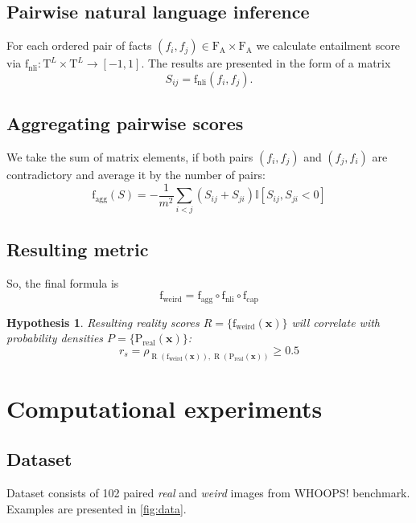 \documentclass[11pt]{article}
\newtheorem{hyp}{Hypothesis}
\begin{document}
\subsection{Pairwise natural language inference}

For each ordered pair of facts $(f_i, f_j) \in \mathrm{F}_\text{A} \times \mathrm{F}_\text{A}$ we calculate entailment score via $\text{f}_\text{nli}: \mathrm{T}^{L}\times \mathrm{T}^{L} \to [-1, 1]$.
The results are presented in the form of a matrix
\[S_{ij} = \text{f}_\text{nli}(f_i, f_j). \]

\subsection{Aggregating pairwise scores}

We take the sum of matrix elements, if both pairs $(f_i, f_j)$ and $(f_j, f_i)$ are contradictory and average it by the number of pairs:
\[\text{f}_\text{agg} (S) = - \dfrac{1}{m^2} \sum\limits_{i < j} (S_{ij} + S_{ji}) \mathbb{I} [S_{ij}, S_{ji} < 0] \]

\subsection{Resulting metric}

So, the final formula is \[\text{f}_\text{weird} = \text{f}_\text{agg} \circ \text{f}_\text{nli} \circ \text{f}_\text{cap}\]

\begin{hyp}
Resulting reality scores $R = \{\text{f}_\text{weird}(\textbf{x})\}$ will correlate with probability densities $P = \{\mathrm{P}_\text{real} (\textbf{x})\}$:
\[\displaystyle r_{s} = \rho _{\operatorname {R} (\text{f}_\text{weird}(\textbf{x})),\operatorname {R} (\mathrm{P}_\text{real} (\textbf{x}))} \ge 0.5\]
\end{hyp}

\section{Computational experiments}

\subsection{Dataset}

Dataset consists of 102 paired \textit{real} and \textit{weird} images from WHOOPS! benchmark. Examples are presented in \ref{fig:data}.
\end{document}
